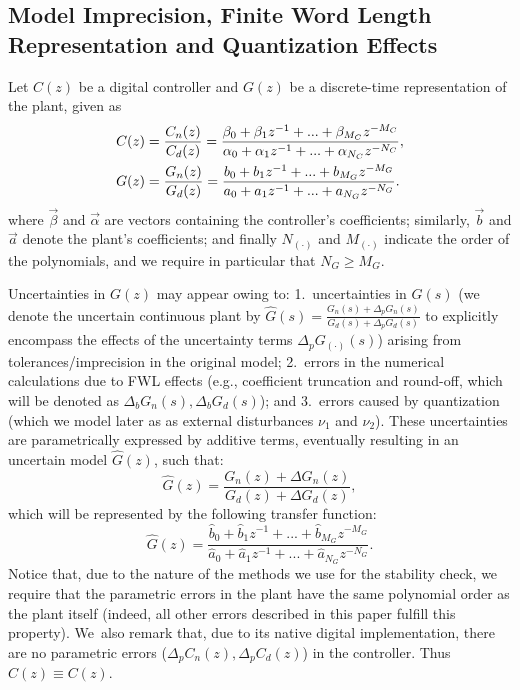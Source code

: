 \documentclass[final]{sig-alternate-05-2015}
\newcommand{\red}[1]{{\color{red}#1}}
\begin{document}
\subsection{Model Imprecision, Finite Word Length Representation and Quantization Effects}
\label{verifying-closed-loop-control-systems}

Let $C(z)$ be a digital controller and $G(z)$ be a discrete-time representation of the plant, 
given as
%
\begin{align}
\small
\label{controller_plant_tf}
C(z)&=\frac{C_n(z)}{C_d(z)}=\frac{\beta_{0}+\beta_{1}z^{-1}+...+\beta_{M_C}z^{-M_C}}{\alpha_{0}+\alpha_{1}z^{-1}+...+\alpha_{N_C}z^{-N_C}}, \\
G(z)&=\frac{G_n(z)}{G_d(z)}=\frac{b_{0}+b_{1}z^{-1}+...+b_{M_G}z^{-M_G}}{a_{0}+a_{1}z^{-1}+...+a_{N_G}z^{-N_G}}.
\end{align}
%
where $\vec{\beta}$ and $\vec{\alpha}$ are vectors containing the
controller's coefficients; similarly, $\vec{b}$ and $\vec{a}$ denote the
plant's coefficients; 
and finally $N_{(\cdot)}$ and $M_{(\cdot)}$ indicate the order of the polynomials,  
and we require in particular that $N_G \geq M_G$. 

Uncertainties in $G(z)$ may appear owing to: 1.~uncertainties in $G(s)$ (we
denote the uncertain continuous plant by
$\hat{G}(s)=\frac{G_n(s)+\Delta_p{G}_n(s)}{G_d(s)+\Delta_p{G}_d(s)}$ to
explicitly encompass the effects of the uncertainty terms
$\Delta_p{G}_{(\cdot)}(s)$) arising from tolerances/imprecision in the
original model; 2.~errors in the numerical calculations due to FWL effects
(e.g., coefficient truncation and round-off, which will be denoted as
$\Delta_b{G}_n(s),\Delta_b{G}_d(s)$); and 3.~errors caused by quantization
(which we model later as as external disturbances $\nu_1$ and $\nu_2$). 
These uncertainties are parametrically expressed by additive terms,
eventually resulting in an uncertain model $\hat{G}(z)$, such that:
%
\begin{equation}
\hat{G}(z)=\frac{G_n(z)+\Delta G_n(z)}{G_d(z)+\Delta G_d(z)},
\end{equation}
%
which will be represented by the following transfer function:
%
\begin{equation}
\hat{G}(z)=\frac{\hat{b}_{0}+\hat{b}_{1}z^{-1}+...+\hat{b}_{M_G}z^{-M_G}}{\hat{a}_{0}+\hat{a}_{1}z^{-1}+...+\hat{a}_{N_G}z^{-N_G}}. 
\end{equation}
%
Notice that, due to the nature of the methods we use for the stability
check, we require that the parametric errors in the plant have the same
polynomial order as the plant itself (indeed, all other errors described in
this paper fulfill this property).  We~also remark that, due to its native
digital implementation, there are no parametric errors ($\Delta_pC_n(z),
\Delta_pC_d(z)$) in the controller.  Thus $\hat{C}(z) \equiv C(z)$.
\end{document}
